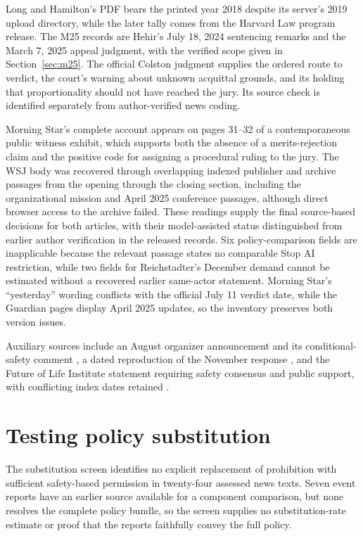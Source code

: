 \documentclass[11pt]{article}
\begin{document}
Long and Hamilton's PDF bears the printed year 2018 despite its server's 2019 upload directory, while the later tally comes from the Harvard Law program release. The M25 records are Hehir's July 18, 2024 sentencing remarks and the March 7, 2025 appeal judgment, with the verified scope given in Section~\ref{sec:m25}. The official Colston judgment supplies the ordered route to verdict, the court's warning about unknown acquittal grounds, and its holding that proportionality should not have reached the jury. Its source check is identified separately from author-verified news coding.

Morning Star's complete account appears on pages 31--32 of a contemporaneous public witness exhibit, which supports both the absence of a merits-rejection claim and the positive code for assigning a procedural ruling to the jury. The WSJ body was recovered through overlapping indexed publisher and archive passages from the opening through the closing section, including the organizational mission and April 2025 conference passages, although direct browser access to the archive failed. These readings supply the final source-based decisions for both articles, with their model-assisted status distinguished from earlier author verification in the released records. Six policy-comparison fields are inapplicable because the relevant passage states no comparable Stop AI restriction, while two fields for Reichstadter's December demand cannot be estimated without a recovered earlier same-actor statement. Morning Star's ``yesterday'' wording conflicts with the official July 11 verdict date, while the Guardian pages display April 2025 updates, so the inventory preserves both version issues.

Auxiliary sources include an August organizer announcement and its conditional-safety comment \citep{allen}, a dated reproduction of the November response \citep{mirror}, and the Future of Life Institute statement requiring safety consensus and public support, with conflicting index dates retained \citep{fli,fliindexes}.

\section{Testing policy substitution}
\label{app:logic}
The substitution screen identifies no explicit replacement of prohibition with sufficient safety-based permission in twenty-four assessed news texts. Seven event reports have an earlier source available for a component comparison, but none resolves the complete policy bundle, so the screen supplies no substitution-rate estimate or proof that the reports faithfully convey the full policy.
\end{document}
